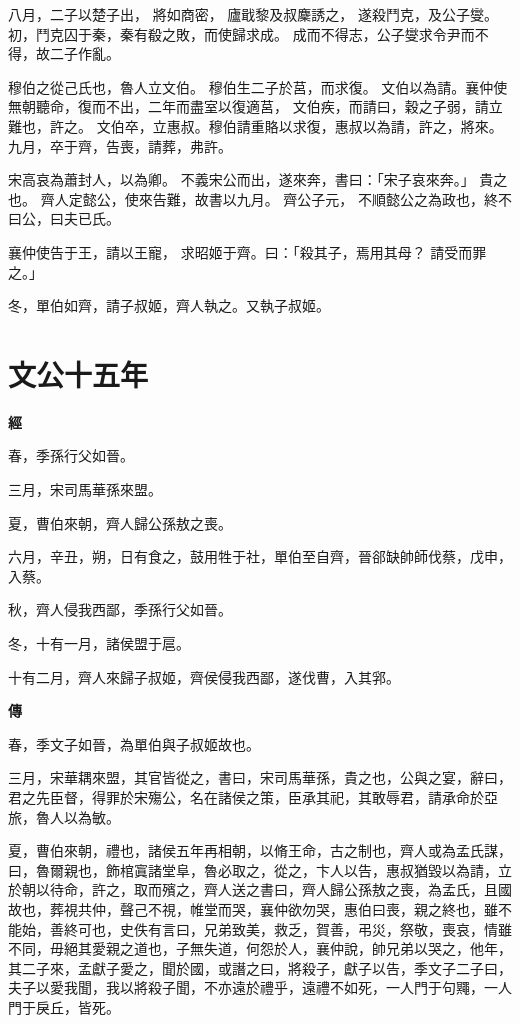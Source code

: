 \documentclass{ctexart}
\begin{document}
八月，二子以楚子出，
將如商密，
廬戢黎及叔麇誘之，
遂殺鬥克，及公子燮。
初，鬥克囚于秦，秦有殽之敗，而使歸求成。
成而不得志，公子燮求令尹而不得，故二子作亂。

穆伯之從己氏也，魯人立文伯。
穆伯生二子於莒，而求復。
文伯以為請。襄仲使無朝聽命，復而不出，二年而盡室以復適莒，
文伯疾，而請曰，穀之子弱，請立難也，許之。
文伯卒，立惠叔。穆伯請重賂以求復，惠叔以為請，許之，將來。
九月，卒于齊，告喪，請葬，弗許。

宋高哀為蕭封人，以為卿。
不義宋公而出，遂來奔，書曰：「宋子哀來奔。」
貴之也。
齊人定懿公，使來告難，故書以九月。
齊公子元，
不順懿公之為政也，終不曰公，曰夫已氏。

襄仲使告于王，請以王寵，
求昭姬于齊。曰：「殺其子，焉用其母？
請受而罪之。」

冬，單伯如齊，請子叔姬，齊人執之。又執子叔姬。





\section{文公十五年}


\textbf{經}



春，季孫行父如晉。

三月，宋司馬華孫來盟。

夏，曹伯來朝，齊人歸公孫敖之喪。

六月，辛丑，朔，日有食之，鼓用牲于社，單伯至自齊，晉郤缺帥師伐蔡，戊申，入蔡。

秋，齊人侵我西鄙，季孫行父如晉。

冬，十有一月，諸侯盟于扈。

十有二月，齊人來歸子叔姬，齊侯侵我西鄙，遂伐曹，入其郛。

\textbf{傳}



春，季文子如晉，為單伯與子叔姬故也。

三月，宋華耦來盟，其官皆從之，書曰，宋司馬華孫，貴之也，公與之宴，辭曰，君之先臣督，得罪於宋殤公，名在諸侯之策，臣承其祀，其敢辱君，請承命於亞旅，魯人以為敏。

夏，曹伯來朝，禮也，諸侯五年再相朝，以脩王命，古之制也，齊人或為孟氏謀，曰，魯爾親也，飾棺寘諸堂阜，魯必取之，從之，卞人以告，惠叔猶毀以為請，立於朝以待命，許之，取而殯之，齊人送之書曰，齊人歸公孫敖之喪，為孟氏，且國故也，葬視共仲，聲己不視，帷堂而哭，襄仲欲勿哭，惠伯曰喪，親之終也，雖不能始，善終可也，史佚有言曰，兄弟致美，救乏，賀善，弔災，祭敬，喪哀，情雖不同，毋絕其愛親之道也，子無失道，何怨於人，襄仲說，帥兄弟以哭之，他年，其二子來，孟獻子愛之，聞於國，或譖之曰，將殺子，獻子以告，季文子二子曰，夫子以愛我聞，我以將殺子聞，不亦遠於禮乎，遠禮不如死，一人門于句鼆，一人門于戾丘，皆死。
\end{document}
